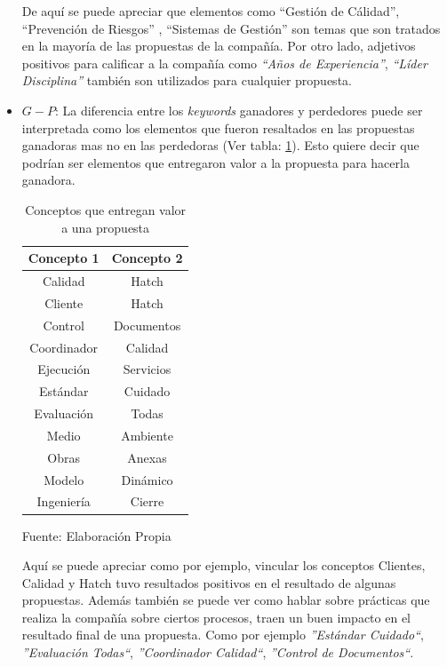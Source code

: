 \begin{itemize}
        De aquí se puede apreciar que elementos como ``Gestión de Cálidad'', ``Prevención de Riesgos'' , ``Sistemas de Gestión'' son temas que son tratados en la mayoría de las propuestas de la compañía. Por otro lado, adjetivos positivos para calificar a la compañía como \textit{``Años de Experiencia''}, \textit{``Líder Disciplina''} también son utilizados para cualquier propuesta.
        
        \item $G - P$: La diferencia entre los \textit{keywords} ganadores y perdedores puede ser interpretada como los elementos que fueron resaltados en las propuestas ganadoras mas no en las perdedoras (Ver tabla: \ref{table:Conceptos_con_valor}). Esto quiere decir que podrían ser elementos que entregaron valor a la propuesta para hacerla ganadora.
        
        \begin{table}[H]
        \centering
        \begin{tabular}{|c|c|}
        \hline
        \textbf{Concepto 1} & \textbf{Concepto 2} \\ \hline
        Calidad             & Hatch               \\ \hline
        Cliente             & Hatch               \\ \hline
        Control             & Documentos          \\ \hline
        Coordinador         & Calidad             \\ \hline
        Ejecución           & Servicios           \\ \hline
        Estándar            & Cuidado             \\ \hline
        Evaluación          & Todas               \\ \hline
        Medio               & Ambiente            \\ \hline
        Obras               & Anexas              \\ \hline
        Modelo              & Dinámico            \\ \hline
        Ingeniería          & Cierre              \\ \hline
        \end{tabular}
        \caption{\label{table:Conceptos_con_valor} Conceptos que entregan valor a una propuesta} Fuente: Elaboración Propia
        \end{table}
        
        Aquí se puede apreciar como por ejemplo, vincular los conceptos Clientes, Calidad y Hatch tuvo resultados positivos en el resultado de algunas propuestas. Además también se puede ver como hablar sobre prácticas que realiza la compañía sobre ciertos procesos, traen un buen impacto en el resultado final de una propuesta. Como por ejemplo \textit{''Estándar Cuidado``}, \textit{''Evaluación Todas``}, \textit{''Coordinador Calidad``}, \textit{''Control de Documentos``}.
        

\end{itemize}
